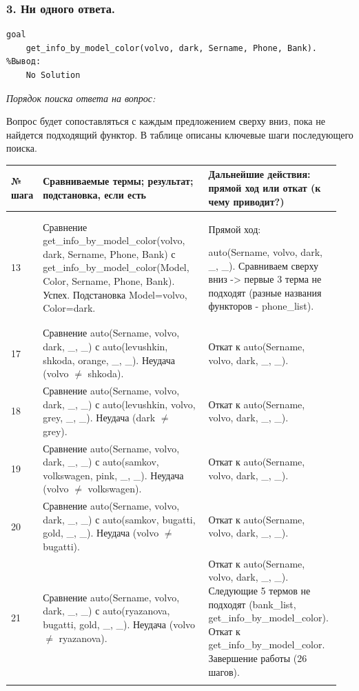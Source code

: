 \documentclass[a4paper,12pt]{article}
\begin{document}
	\newpage

	\subsubsection*{3. Ни одного ответа.}
	
	\begin{verbatim}
goal
	get_info_by_model_color(volvo, dark, Sername, Phone, Bank).
%Вывод:
	No Solution
	\end{verbatim}
	
	\textit{Порядок поиска ответа на вопрос:}
	
	Вопрос будет сопоставляться с каждым предложением сверху вниз, пока не
	найдется подходящий функтор. В таблице описаны ключевые шаги последующего поиска.
	
	\begin{center}
		\begin{longtable}[h!]{|p{0.05\linewidth}|p{0.5\linewidth}|p{ 0.4\linewidth}|}
				\hline
				{\bf  № шага} & {\bf Сравниваемые термы; результат; подстановка, если есть} & {\bf Дальнейшие действия: прямой ход или откат (к чему приводит?)} \\
				\hline
				{13} & {Сравнение get\_info\_by\_model\_color(volvo, dark, Sername, Phone, Bank) с get\_info\_by\_model\_color(Model, Color, Sername, Phone, Bank). Успех. Подстановка Model=volvo, Color=dark.} & {Прямой ход:
				
					auto(Sername, volvo, dark, \_, \_). Сравниваем сверху вниз -> первые 3 терма не подходят (разные названия функторов - phone\_list).}\\
				\hline
				{17} & {Сравнение auto(Sername, volvo, dark, \_, \_) с auto(levushkin, shkoda, orange, \_, \_). Неудача (volvo $\neq$ shkoda).} & {Откат к auto(Sername, volvo, dark, \_, \_).}\\
				\hline
				{18} & {Сравнение auto(Sername, volvo, dark, \_, \_) с auto(levushkin, volvo, grey, \_, \_). Неудача (dark $\neq$ grey).} & {Откат к auto(Sername, volvo, dark, \_, \_).}\\
				\hline
				{19} & {Сравнение auto(Sername, volvo, dark, \_, \_) с auto(samkov, volkswagen, pink, \_, \_). Неудача (volvo $\neq$ volkswagen).} & {Откат к auto(Sername, volvo, dark, \_, \_).}\\
				\hline
				{20} & {Сравнение auto(Sername, volvo, dark, \_, \_) с auto(samkov, bugatti, gold, \_, \_). Неудача (volvo $\neq$ bugatti).} & {Откат к auto(Sername, volvo, dark, \_, \_).}\\
				\hline
				{21} & {Сравнение auto(Sername, volvo, dark, \_, \_) с auto(ryazanova, bugatti, gold, \_, \_). Неудача (volvo $\neq$ ryazanova).} & {Откат к auto(Sername, volvo, dark, \_, \_). Следующие 5 термов не подходят (bank\_list, get\_info\_by\_model\_color). Откат к get\_info\_by\_model\_color. Завершение работы (26 шагов).}\\
				\hline
			\label{m3}
		\end{longtable}
	\end{center}
	
\end{document}
